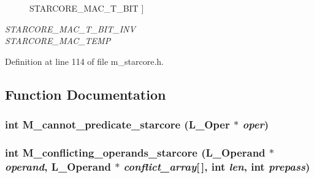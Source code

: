 \begin{Desc}
\begin{description}
{STARCORE\_\-MAC\_\-T\_\-BIT\label{m__starcore_8h_16af7b253440dadd46a80a4b9fddba4d146bc46aa9cc3a704667734c9baacdbc}
}]\item[{\em 
STARCORE\_\-MAC\_\-T\_\-BIT\_\-INV\label{m__starcore_8h_16af7b253440dadd46a80a4b9fddba4da927dde2814219e0a1f2cf0340a75ce2}
}]\item[{\em 
STARCORE\_\-MAC\_\-TEMP\label{m__starcore_8h_16af7b253440dadd46a80a4b9fddba4d50bfc8574913e850de50e2c9b76e08a9}
}]\end{description}
\end{Desc}



Definition at line 114 of file m\_\-starcore.h.

\subsection{Function Documentation}
\subsubsection{\setlength{\rightskip}{0pt plus 5cm}int M\_\-cannot\_\-predicate\_\-starcore (L\_\-Oper $\ast$ {\em oper})}\label{m__starcore_8h_21f28d210a60e8ec0cf88b481d1c426f}


\subsubsection{\setlength{\rightskip}{0pt plus 5cm}int M\_\-conflicting\_\-operands\_\-starcore (L\_\-Operand $\ast$ {\em operand}, L\_\-Operand $\ast$ {\em conflict\_\-array}[$\,$], int {\em len}, int {\em prepass})}\label{m__starcore_8h_d39fa57db343add1f56ab670702e5055}




